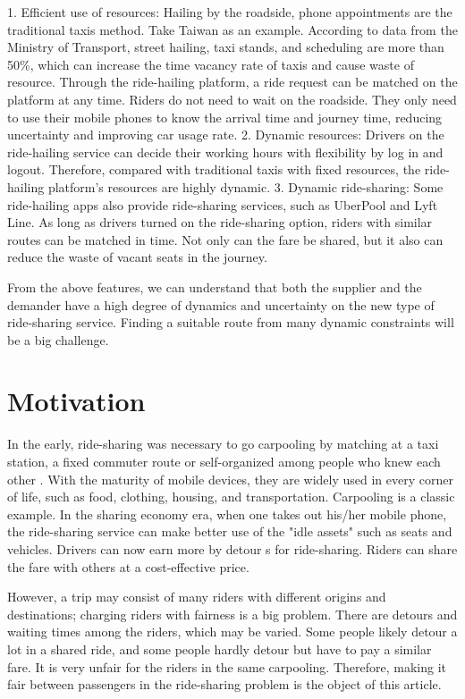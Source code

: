 1. Efficient use of resources: Hailing by the roadside, phone appointments are the traditional taxis method. Take Taiwan as an example. According to data from the Ministry of Transport, street hailing, taxi stands, and scheduling \cite{noauthor_100nianjichengcheyingyunzhuangkuangdiaochabaogao_2012} are more than 50\%, which can increase the time vacancy rate of taxis and cause waste of resource. Through the ride-hailing platform, a ride request can be matched on the platform at any time. Riders do not need to wait on the roadside. They only need to use their mobile phones to know the arrival time and journey time, reducing uncertainty and improving car usage rate.
2. Dynamic resources: Drivers on the ride-hailing service can decide their working hours with flexibility by log in and logout. Therefore, compared with traditional taxis with fixed resources, the ride-hailing platform's resources are highly dynamic.
3. Dynamic ride-sharing: Some ride-hailing apps also provide ride-sharing services, such as UberPool and Lyft Line. As long as drivers turned on the ride-sharing option, riders with similar routes can be matched in time. Not only can the fare be shared, but it also can reduce the waste of vacant seats in the journey.

From the above features, we can understand that both the supplier and the demander have a high degree of dynamics and uncertainty on the new type of ride-sharing service. Finding a suitable route from many dynamic constraints will be a big challenge.

\section{Motivation}

In the early, ride-sharing was necessary to go carpooling by matching at a taxi station, a fixed commuter route or self-organized among people who knew each other \cite{chan_ridesharing_2012}. With the maturity of mobile devices, they are widely used in every corner of life, such as food, clothing, housing, and transportation. Carpooling is a classic example. In the sharing economy era, when one takes out his/her mobile phone, the ride-sharing service can make better use of the "idle assets" such as seats and vehicles. Drivers can now earn more by detour s for ride-sharing. Riders can share the fare with others at a cost-effective price.

However, a trip may consist of many riders with different origins and destinations; charging riders with fairness is a big problem. There are detours and waiting times among the riders, which may be varied. Some people likely detour a lot in a shared ride, and some people hardly detour but have to pay a similar fare. It is very unfair for the riders in the same carpooling. Therefore, making it fair between passengers in the ride-sharing problem is the object of this article.


